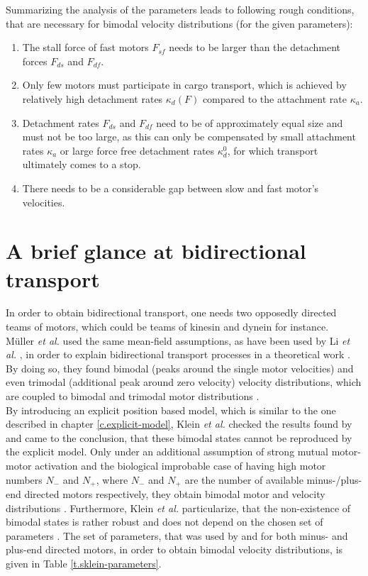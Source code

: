 Summarizing the analysis of the parameters leads to following rough conditions, that are necessary for bimodal velocity distributions (for the given parameters):
\begin{enumerate}
 \item The stall force of fast motors $F_{sf}$ needs to be larger than the detachment forces $F_{ds}$ and $F_{df}$.
 \item Only few motors must participate in cargo transport, which is achieved by relatively high detachment rates $\kappa_d\left(F\right)$ compared to the attachment rate $\kappa_a$.
 \item Detachment rates $F_{ds}$ and $F_{df}$ need to be of approximately equal size and must not be too large, as this can only be compensated by small attachment rates $\kappa_a$ or large force free detachment rates $\kappa_d^0$, for which
 transport ultimately comes to a stop.
 \item There needs to be a considerable gap between slow and fast motor's velocities.
\end{enumerate}


\section{A brief glance at bidirectional transport}\label{s.bidirectional-transport}
In order to obtain bidirectional transport, one needs two opposedly directed teams of motors, which could be teams of kinesin and dynein for instance. \\
Müller \textit{et al.} \cite{pnas105} used the same mean-field assumptions, as have been used by Li \textit{et al.} \cite{li}, in order to explain bidirectional transport processes in a theoretical
work \cite{pnas105}. By doing so, they found bimodal (peaks around the single motor velocities) and even trimodal (additional peak around zero velocity) velocity distributions, which are coupled to
bimodal and trimodal motor distributions \cite{pnas105}. \\
By introducing an explicit position based model, which is similar to the one described in chapter \ref{c.explicit-model}, Klein \textit{et al.} \cite{sklein} checked the results found by
\cite{pnas105} and came to the conclusion, that these bimodal states cannot be reproduced by the explicit model. Only under an additional assumption of strong mutual motor-motor activation and the
biological improbable case of having high motor numbers $N_-$ and $N_+$, where $N_-$ and $N_+$ are the number of available minus-/plus-end directed motors respectively, they obtain bimodal motor
and velocity distributions \cite{sklein}. Furthermore, Klein \textit{et al.} \cite{sklein} particularize, that the non-existence of bimodal states is rather robust and does not depend on the chosen
set of parameters \cite{sklein}. The set of parameters, that was used by \cite{sklein} and \cite{pnas105} for both minus- and plus-end directed motors, in order to obtain bimodal velocity
distributions, is given in Table \ref{t.sklein-parameters}.

